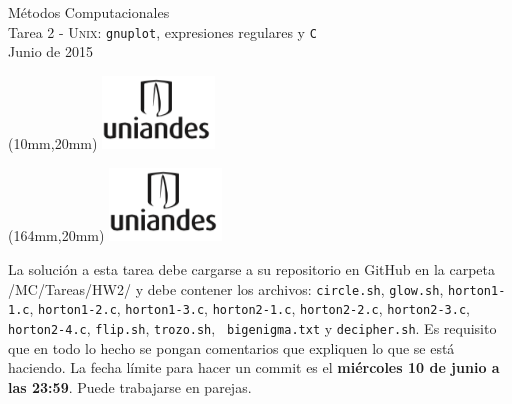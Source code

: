 \documentclass[11pt,letterpaper]{exam}
\begin{document}
\begin{center}
{\Large Métodos Computacionales} \\
Tarea 2 - \textsc{Unix}: \verb+gnuplot+, expresiones regulares y \verb+C+\\
Junio de 2015
\end{center}

\begin{textblock*}{40mm}(10mm,20mm)
  \includegraphics[width=3cm]{logoUniandes.png}
\end{textblock*}

\begin{textblock*}{40mm}(164mm,20mm)
  \includegraphics[width=3cm]{logoUniandes.png}
\end{textblock*}

\vspace{0.5cm}

La solución a esta tarea debe cargarse a su repositorio en GitHub en la carpeta /MC/Tareas/HW2/ y debe contener los archivos: \verb+circle.sh+, \verb+glow.sh+, \verb+horton1-1.c+, \verb+horton1-2.c+, \verb+horton1-3.c+, \verb+horton2-1.c+, \verb+horton2-2.c+, \verb+horton2-3.c+, \verb+horton2-4.c+, \verb+flip.sh+, \verb+trozo.sh+, \verb+ bigenigma.txt+ y \verb+decipher.sh+. Es requisito que en todo lo hecho se pongan comentarios que expliquen lo que se está haciendo. La fecha límite para hacer un commit es el \textbf{miércoles 10 de junio a las 23:59}. Puede trabajarse en parejas.

\vspace{0.5cm}
\end{document}
